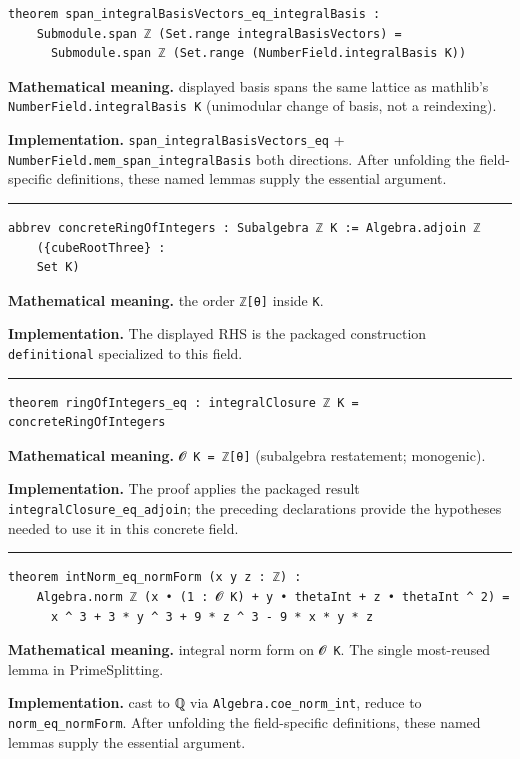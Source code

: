 \documentclass[UTF8,a4paper,11pt,fontset=fandol]{ctexart}
\theoremstyle{definition}
\newcommand{\statementsep}{\par\medskip\hrule\medskip}
\begin{document}
\begin{verbatim}
theorem span_integralBasisVectors_eq_integralBasis :
    Submodule.span ℤ (Set.range integralBasisVectors) =
      Submodule.span ℤ (Set.range (NumberField.integralBasis K))
\end{verbatim}
\noindent\textbf{Mathematical meaning.} displayed basis spans the same lattice as mathlib's \texttt{NumberField.\allowbreak{}integralBasis K} (unimodular change of basis, not a reindexing).\par
\noindent\textbf{Implementation.} \texttt{span\_\allowbreak{}integralBasisVectors\_\allowbreak{}eq} + \texttt{NumberField.\allowbreak{}mem\_\allowbreak{}span\_\allowbreak{}integralBasis} both directions. After unfolding the field-specific definitions, these named lemmas supply the essential argument.\par
\statementsep
\begin{verbatim}
abbrev concreteRingOfIntegers : Subalgebra ℤ K := Algebra.adjoin ℤ
    ({cubeRootThree} :
    Set K)
\end{verbatim}
\noindent\textbf{Mathematical meaning.} the order \texttt{ℤ[θ]} inside \texttt{K}.\par
\noindent\textbf{Implementation.} The displayed RHS is the packaged construction \texttt{definitional} specialized to this field.\par
\statementsep
\begin{verbatim}
theorem ringOfIntegers_eq : integralClosure ℤ K = concreteRingOfIntegers
\end{verbatim}
\noindent\textbf{Mathematical meaning.} \texttt{𝓞 K = ℤ[θ]} (subalgebra restatement; monogenic).\par
\noindent\textbf{Implementation.} The proof applies the packaged result \texttt{integralClosure\_\allowbreak{}eq\_\allowbreak{}adjoin}; the preceding declarations provide the hypotheses needed to use it in this concrete field.\par
\statementsep
\begin{verbatim}
theorem intNorm_eq_normForm (x y z : ℤ) :
    Algebra.norm ℤ (x • (1 : 𝓞 K) + y • thetaInt + z • thetaInt ^ 2) =
      x ^ 3 + 3 * y ^ 3 + 9 * z ^ 3 - 9 * x * y * z
\end{verbatim}
\noindent\textbf{Mathematical meaning.} integral norm form on \texttt{𝓞 K}. The single most-reused lemma in PrimeSplitting.\par
\noindent\textbf{Implementation.} cast to ℚ via \texttt{Algebra.\allowbreak{}coe\_\allowbreak{}norm\_\allowbreak{}int}, reduce to \texttt{norm\_\allowbreak{}eq\_\allowbreak{}normForm}. After unfolding the field-specific definitions, these named lemmas supply the essential argument.\par
\end{document}
